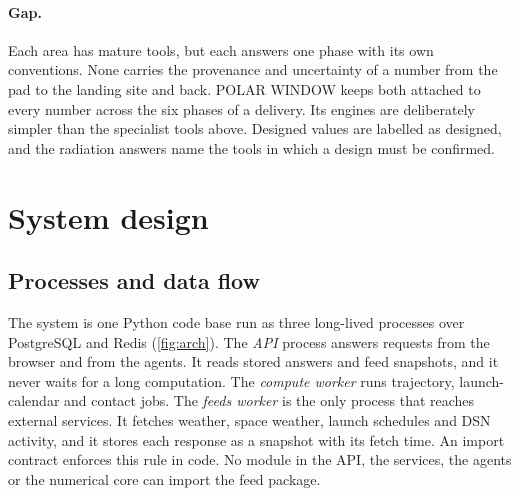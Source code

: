 \documentclass[11pt,a4paper]{article}
\begin{document}
\paragraph{Gap.} Each area has mature tools, but each answers one phase with its own
conventions. None carries the provenance and uncertainty of a number from the pad to the
landing site and back. POLAR WINDOW keeps both attached to every number across the six
phases of a delivery. Its engines are deliberately
simpler than the specialist tools above. Designed values are labelled as designed, and
the radiation answers name the tools in which a design must be confirmed.

\section{System design}
\label{sec:design}

\subsection{Processes and data flow}

The system is one Python code base run as three long-lived processes over PostgreSQL
and Redis (\cref{fig:arch}). The \emph{API} process answers requests from the browser
and from the agents. It reads stored answers and feed snapshots, and it never waits for
a long computation. The \emph{compute worker} runs trajectory, launch-calendar and
contact jobs. The \emph{feeds worker} is the only process that reaches external services. It fetches weather, space weather, launch schedules and DSN activity, and it stores each response as a snapshot with its fetch time. An import contract enforces this
rule in code. No module in the API, the services, the agents or the numerical core can
import the feed package.
\end{document}
